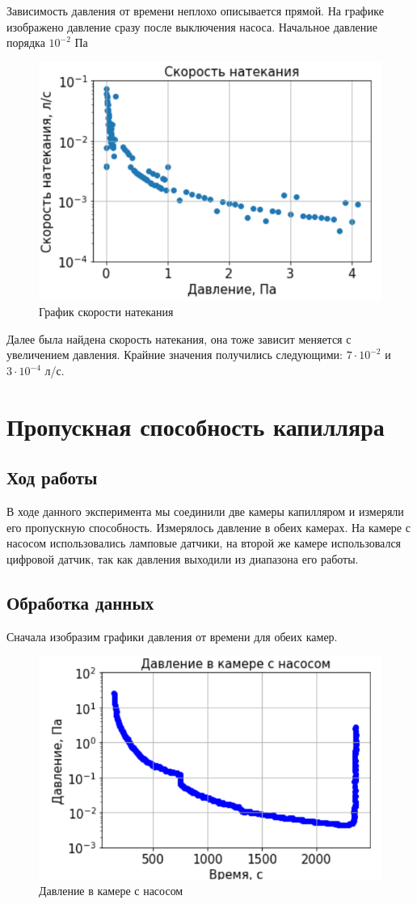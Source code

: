 \documentclass[a4paper,14pt]{extarticle}
\begin{document}
			Зависимость давления от времени неплохо описывается прямой. На графике изображено давление сразу после выключения насоса. Начальное давление порядка $10^{-2}$ Па
		
			\begin{figure}[h!]
				\centering
				\includegraphics[width=.55\linewidth]{Screenshot_66.png}
				\caption{График скорости натекания}
				\label{fig1}
			\end{figure}
		
			Далее была найдена скорость натекания, она тоже зависит меняется с увеличением давления. Крайние значения получились следующими: $7 \cdot 10^{-2}$ и $3 \cdot 10 ^ {-4}$ л/с.
	\section{Пропускная способность капилляра}
		\subsection{Ход работы}
			В ходе данного эксперимента мы соединили две камеры капилляром и измеряли его пропускную способность. Измерялось давление в обеих камерах. На камере с насосом использовались ламповые датчики, на второй же камере использовался цифровой датчик, так как давления выходили из диапазона его работы. 
		\subsection{Обработка данных}
			Сначала изобразим графики давления от времени для обеих камер.
			\newpage
			\begin{figure}[h!]
				\centering
				\includegraphics[width=.75\linewidth]{Screenshot_68.png}
				\caption{Давление в камере с насосом}
				\label{fig1}
			\end{figure}
		
\end{document}
